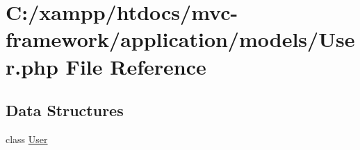 \hypertarget{_user_8php}{}\section{C\+:/xampp/htdocs/mvc-\/framework/application/models/\+User.php File Reference}
\label{_user_8php}
\subsection*{Data Structures}
\begin{DoxyCompactItemize}
\item 
class \hyperlink{class_user}{User}
\end{DoxyCompactItemize}
